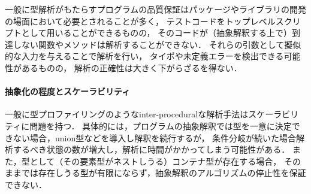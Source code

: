 一般に型解析がもたらすプログラムの品質保証はパッケージやライブラリの開発の場面において必要とされることが多く，
テストコードをトップレベルスクリプトとして用いることができるものの，
そのコードが（抽象解釈する上で）到達しない関数やメソッドは解析することができない．
それらの引数として擬似的な入力を与えることで解析を行い，
タイポや未定義エラーを検出できる可能性があるものの，
解析の正確性は大きく下がらざるを得ない．

%
%
%
%
%
%

\paragraph{抽象化の程度とスケーラビリティ}

一般に型プロファイリングのようなinter-proceduralな解析手法はスケーラビリティに問題を持つ．
具体的には，プログラムの抽象解釈では型を一意に決定できない場合，union型などを導入し解釈を続行するが，
条件分岐が続いた場合解析するべき状態の数が増大し，解析に時間がかかってしまう可能性がある．
また，型として（その要素型がネストしうる）コンテナ型が存在する場合，
そのままでは存在しうる型が有限にならず，抽象解釈のアルゴリズムの停止性を保証できない．

